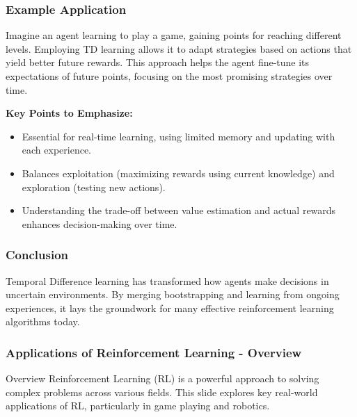 \documentclass[aspectratio=169]{beamer}
\begin{document}
\begin{frame}[fragile]
    \frametitle{Example Application}
    Imagine an agent learning to play a game, gaining points for reaching different levels. Employing TD learning allows it to adapt strategies based on actions that yield better future rewards. This approach helps the agent fine-tune its expectations of future points, focusing on the most promising strategies over time.
    
    \textbf{Key Points to Emphasize:}
    \begin{itemize}
        \item Essential for real-time learning, using limited memory and updating with each experience.
        \item Balances exploitation (maximizing rewards using current knowledge) and exploration (testing new actions).
        \item Understanding the trade-off between value estimation and actual rewards enhances decision-making over time.
    \end{itemize}
\end{frame}

\begin{frame}[fragile]
    \frametitle{Conclusion}
    Temporal Difference learning has transformed how agents make decisions in uncertain environments. By merging bootstrapping and learning from ongoing experiences, it lays the groundwork for many effective reinforcement learning algorithms today.
\end{frame}

\begin{frame}[fragile]
    \frametitle{Applications of Reinforcement Learning - Overview}
    \begin{block}{Overview}
        Reinforcement Learning (RL) is a powerful approach to solving complex problems across various fields. This slide explores key real-world applications of RL, particularly in game playing and robotics.
    \end{block}
\end{frame}
\end{document}
